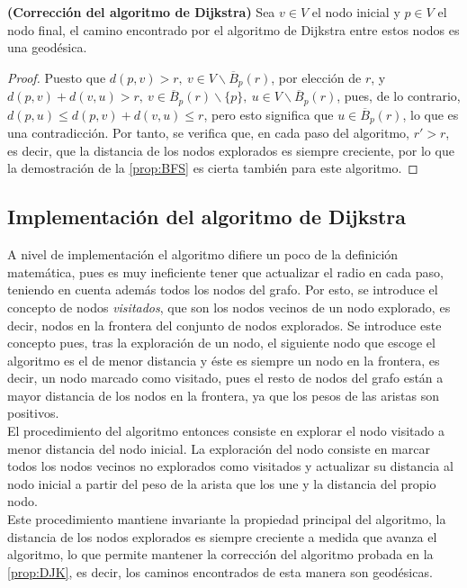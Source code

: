 \begin{proposicion}\label{prop:DJK}
	\textbf{(Corrección del algoritmo de Dijkstra)} Sea $v \in V$ el nodo inicial y $p \in V$ el nodo final, el camino encontrado por el algoritmo de Dijkstra entre estos nodos es una geodésica.
\end{proposicion}

\begin{proof}
	Puesto que $d(p,v) > r,\ v \in V\backslash\overline B_p(r)$, por elección de $r$, y $d(p,v) + d(v,u) > r,\ v \in \overline B_p(r)\backslash\{p\},\ u \in V\backslash\overline B_p(r)$, pues, de lo contrario, $d(p,u) \leq d(p,v) + d(v,u) \leq r$, pero esto significa que $u \in \overline B_p(r)$, lo que es una contradicción. Por tanto, se verifica que, en cada paso del algoritmo, $r' > r$, es decir, que la distancia de los nodos explorados es siempre creciente, por lo que la demostración de la \autoref{prop:BFS} es cierta también para este algoritmo.
\end{proof}

\subsection{Implementación del algoritmo de Dijkstra}

A nivel de implementación el algoritmo difiere un poco de la definición matemática, pues es muy ineficiente tener que actualizar el radio en cada paso, teniendo en cuenta además todos los nodos del grafo. Por esto, se introduce el concepto de nodos \textit{visitados}, que son los nodos vecinos de un nodo explorado, es decir, nodos en la frontera del conjunto de nodos explorados. Se introduce este concepto pues, tras la exploración de un nodo, el siguiente nodo que escoge el algoritmo es el de menor distancia y éste es siempre un nodo en la frontera, es decir, un nodo marcado como visitado, pues el resto de nodos del grafo están a mayor distancia de los nodos en la frontera, ya que los pesos de las aristas son positivos. \\

El procedimiento del algoritmo entonces consiste en explorar el nodo visitado a menor distancia del nodo inicial. La exploración del nodo consiste en marcar todos los nodos vecinos no explorados como visitados y actualizar su distancia al nodo inicial a partir del peso de la arista que los une y la distancia del propio nodo. \\

Este procedimiento mantiene invariante la propiedad principal del algoritmo, la distancia de los nodos explorados es siempre creciente a medida que avanza el algoritmo, lo que permite mantener la corrección del algoritmo probada en la \autoref{prop:DJK}, es decir, los caminos encontrados de esta manera son geodésicas. \\

